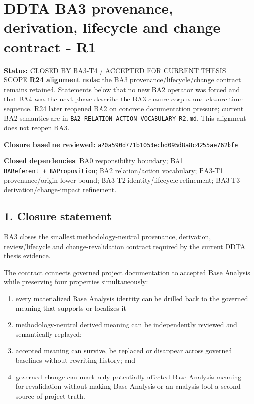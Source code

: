 \documentclass[11pt,a4paper]{article}
\providecommand{\tightlist}{\setlength{\itemsep}{0pt}\setlength{\parskip}{0pt}}
\begin{document}
\section{DDTA BA3 provenance, derivation, lifecycle and change contract - R1}\label{ddta-ba3-provenance-derivation-lifecycle-and-change-contract---r1}

\textbf{Status:} CLOSED BY BA3-T4 / ACCEPTED FOR CURRENT THESIS SCOPE
\textbf{R24 alignment note:} the BA3 provenance/lifecycle/change contract remains retained. Statements below that no new BA2 operator was forced and that BA4 was the next phase describe the BA3 closure corpus and closure-time sequence. R24 later reopened BA2 on concrete documentation pressure; current BA2 semantics are in \texttt{BA2\_RELATION\_ACTION\_VOCABULARY\_R2.md}. This alignment does not reopen BA3.


\textbf{Closure baseline reviewed:} \texttt{a20a590d771b1053ecbd095d8a8c4255ae762bfe}

\textbf{Closed dependencies:} BA0 responsibility boundary; BA1 \texttt{BAReferent\ +\ BAProposition}; BA2 relation/action vocabulary; BA3-T1 provenance/origin lower bound; BA3-T2 identity/lifecycle refinement; BA3-T3 derivation/change-impact refinement.

\subsection{1. Closure statement}\label{closure-statement}

BA3 closes the smallest methodology-neutral provenance, derivation, review/lifecycle and change-revalidation contract required by the current DDTA thesis evidence.

The contract connects governed project documentation to accepted Base Analysis while preserving four properties simultaneously:

\begin{enumerate}
\def\labelenumi{\arabic{enumi}.}
\tightlist
\item
  every materialized Base Analysis identity can be drilled back to the governed meaning that supports or localizes it;
\item
  methodology-neutral derived meaning can be independently reviewed and semantically replayed;
\item
  accepted meaning can survive, be replaced or disappear across governed baselines without rewriting history; and
\item
  governed change can mark only potentially affected Base Analysis meaning for revalidation without making Base Analysis or an analysis tool a second source of project truth.
\end{enumerate}
\end{document}
